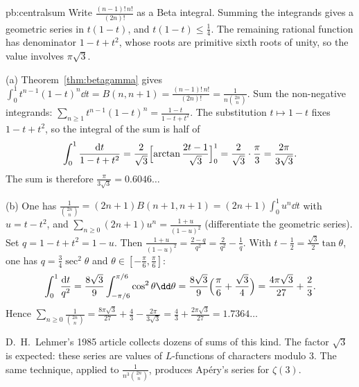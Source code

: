 \begin{solution}{pb:centralsum}
\idea Write $\frac{(n-1)!\,n!}{(2n)!}$ as a Beta integral. Summing the integrands gives a geometric series in $t(1-t)$, and $t(1-t)\le\frac14$. The remaining rational function has denominator $1-t+t^2$, whose roots are primitive sixth roots of unity, so the value involves $\pi\sqrt3$.

\writeup (a) Theorem~\ref{thm:betagamma} gives $\int_0^1t^{n-1}(1-t)^n\dd t=B(n,n+1)=\frac{(n-1)!\,n!}{(2n)!}=\frac1{n\binom{2n}n}$. Sum the non-negative
integrands: $\sum_{n\ge1}t^{n-1}(1-t)^n=\frac{1-t}{1-t+t^2}$. The substitution $t\mapsto1-t$ fixes $1-t+t^2$, so the integral of the sum is half of
\[
\int_0^1\frac{\mathrm dt}{1-t+t^2}=\frac2{\sqrt3}\Bigl[\arctan\frac{2t-1}{\sqrt3}\Bigr]_0^1=\frac2{\sqrt3}\cdot\frac\pi3=\frac{2\pi}{3\sqrt3}.
\]
The sum is therefore $\frac\pi{3\sqrt3}=0.6046\ldots$

(b) One has $\frac1{\binom{2n}n}=(2n+1)B(n+1,n+1)=(2n+1)\int_0^1u^n\dd t$ with $u=t-t^2$, and $\sum_{n\ge0}(2n+1)u^n=\frac{1+u}{(1-u)^2}$ (differentiate the geometric
series). Set $q=1-t+t^2=1-u$. Then $\frac{1+u}{(1-u)^2}=\frac{2-q}{q^2}=\frac2{q^2}-\frac1q$. With $t-\frac12=\frac{\sqrt3}2\tan\theta$, one has $q=\frac34\sec^2\theta$ and
$\theta\in[-\frac\pi6,\frac\pi6]$:
\[
\int_0^1\frac{\mathrm dt}{q^2}=\frac{8\sqrt3}9\int_{-\pi/6}^{\pi/6}\cos^2\theta\dd\theta=\frac{8\sqrt3}9\Bigl(\frac\pi6+\frac{\sqrt3}4\Bigr)=\frac{4\pi\sqrt3}{27}+\frac23.
\]
Hence $\sum_{n\ge0}\frac1{\binom{2n}n}=\frac{8\pi\sqrt3}{27}+\frac43-\frac{2\pi}{3\sqrt3}=\frac43+\frac{2\pi\sqrt3}{27}=1.7364\ldots$

\leads D.~H.~Lehmer's 1985 article collects dozens of sums of this kind. The factor $\sqrt3$ is expected: these series are values
of $L$-functions of characters modulo $3$. The same technique, applied to $\frac1{n^3\binom{2n}n}$, produces Apéry's series for $\zeta(3)$.
\end{solution}

